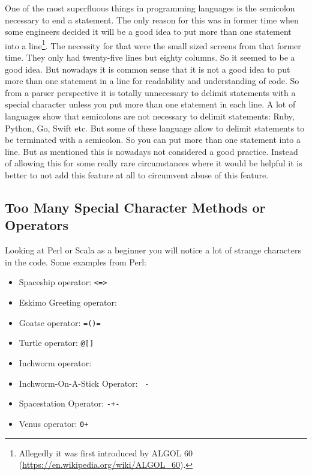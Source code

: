 \documentclass[11pt, a4paper]{report}
\begin{document}

One of the most superfluous things in programming languages is the semicolon necessary to end a statement. The only reason for this was in former time when some engineers decided it will be a good idea to put more than one statement into a line\footnote{Allegedly it was first introduced by ALGOL 60 (\url{https://en.wikipedia.org/wiki/ALGOL_60}).}. The necessity for that were the small sized screens from that former time. They only had twenty-five lines but eighty columns. So it seemed to be a good idea. But nowadays it is common sense that it is not a good idea to put more than one statement in a line for readability and understanding of code. So from a parser perspective it is totally unnecessary to delimit statements with a special character unless you put more than one statement in each line. A lot of languages show that semicolons are not necessary to delimit statements: Ruby, Python, Go, Swift etc. But some of these language allow to delimit statements to be terminated with a semicolon. So you can put more than one statement into a line. But as mentioned this is nowadays not considered a good practice. Instead of allowing this for some really rare circumstances where it would be helpful it is better to not add this feature at all to circumvent abuse of this feature.

\subsection{Too Many Special Character Methods or Operators}

Looking at Perl or Scala as a beginner you will notice a lot of strange characters in the code. Some examples from Perl\cite{secret-perl-operators}:

\begin{itemize}
    \item Spaceship operator: \texttt{<=>}
    \item Eskimo Greeting operator: \texttt{}{}
    \item Goatse operator: \texttt{=()=}
    \item Turtle operator: \texttt{@{[]}}
    \item Inchworm operator: \texttt{~~}
    \item Inchworm-On-A-Stick Operator: \texttt{~-}
    \item Spacestation Operator: \texttt{-+-}
    \item Venus operator: \texttt{0+}
\end{itemize}
\end{document}
